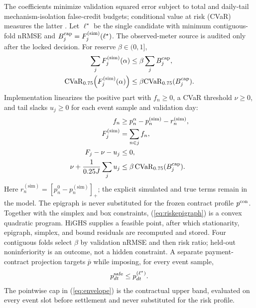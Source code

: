 \documentclass[10pt,journal]{IEEEtran}
\begin{document}
The coefficients minimize validation squared error subject to total and
daily-tail mechanism-isolation false-credit budgets; conditional value at risk
(CVaR) measures the latter \cite{rockafellar2000cvar}. Let
$\ell^\star$ be the single candidate with minimum contiguous-fold nRMSE and
$B_j^{\rm cap}=F_j^{(\mathrm{sim})}(\ell^\star)$. The observed-meter source is
audited only after the locked decision. For reserve $\beta\in(0,1]$,
\begin{align}
 \sum_jF_j^{(\mathrm{sim})}(\alpha)&\leq\beta\sum_jB_j^{\rm cap},\label{eq:totalrisk}\\
 {\rm CVaR}_{0.75}\!\left(F_j^{(\mathrm{sim})}(\alpha)\right)
 &\leq\beta{\rm CVaR}_{0.75}(B_j^{\rm cap}).\label{eq:cvar}
\end{align}
Implementation linearizes the positive part with $f_n\geq0$, a CVaR threshold
$\nu\geq0$, and tail slacks $u_j\geq0$ for each event sample and validation day:
 \begin{align}
  f_n&\geq p^\alpha_n-p^{(\mathrm{sim})}_n-r^{(\mathrm{sim})}_n,\\
  F_j^{(\mathrm{sim})}&=\sum_{n\in j}f_n,\\
  F_j-\nu-u_j&\leq0,\\
  \nu+\frac{1}{0.25J}\sum_j u_j
  &\leq\beta\,\mathrm{CVaR}_{0.75}(B_j^{\rm cap}).
  \label{eq:riskepigraph}
 \end{align}
Here $r^{(\mathrm{sim})}_n=[p^0_n-p^{(\mathrm{sim})}_n]_+$; the explicit simulated
and true terms remain in the model. The epigraph is never substituted for the
frozen contract profile $p^{\rm con}$. Together with the simplex and box
constraints, (\ref{eq:riskepigraph}) is a convex quadratic program. HiGHS
supplies a feasible point, after which stationarity, epigraph, simplex, and
bound residuals are recomputed and stored. Four contiguous folds select $\beta$
by validation nRMSE and then risk ratio; held-out noninferiority is an outcome,
not a hidden constraint. A separate payment-contract projection targets $\bar p$
while imposing, for every event sample,
\begin{equation}
p^{\rm safe}_{dt}\leq p^{(\ell^\star)}_{dt}. \label{eq:envelope}
\end{equation}
The pointwise cap in (\ref{eq:envelope}) is the contractual upper band, evaluated
on every event slot before settlement and never substituted for the risk profile.
\end{document}
